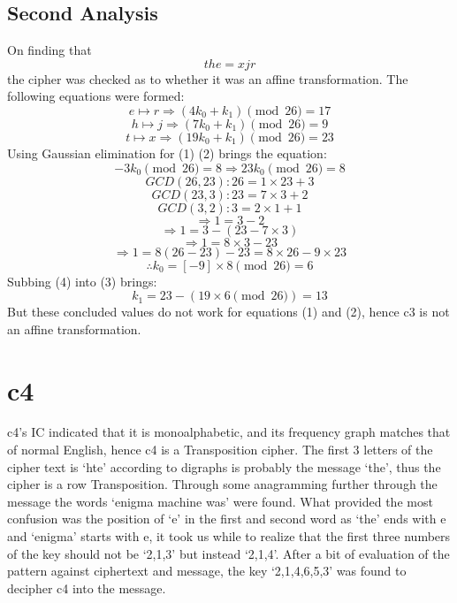 \documentclass{article}
\begin{document}
      \subsection{Second Analysis}
      On finding that \[ the = xjr \] the cipher was checked as to whether it was an affine transformation. The 
      following equations were formed:
      \begin{equation}
        e \mapsto r \Rightarrow (4 k_0 + k_1) \pmod{26} = 17
      \end{equation}
      \begin{equation}
        h \mapsto j \Rightarrow (7 k_0 + k_1) \pmod{26} = 9
      \end{equation}
      \begin{equation}
        t \mapsto x \Rightarrow (19 k_0 + k_1) \pmod{26} = 23
       \end{equation}
       Using Gaussian elimination for (1) \- (2) brings the equation:
       \begin{equation}
         -3 k_0 \pmod{26} = 8 \Rightarrow 23 k_0 \pmod{26} = 8
       \end{equation}
       \[ GCD(26,23): 26 = 1 \times 23 + 3 \]
       \[ GCD(23,3):  23 = 7 \times 3 + 2 \] 
       \[ GCD(3,2): 3 = 2 \times 1 + 1 \] 
       \[ \Rightarrow 1 = 3 - 2 \] 
       \[ \Rightarrow 1 = 3 - (23 - 7 \times 3) \] 
       \[ \Rightarrow 1 = 8 \times 3 - 23 \] 
       \[ \Rightarrow 1 = 8(26 - 23) - 23 = 8 \times 26 - 9 \times 23 \]
       \begin{equation}
         \therefore k_0 = [-9] \times 8 \pmod{26} = 6
       \end{equation}
       Subbing (4) into (3) brings:
       \begin{equation}
         k_1 = 23 - (19 \times 6 \pmod{26}) = 13
       \end{equation}
       But these concluded values do not work for equations (1) and (2), hence c3 is not an affine transformation.
      \section{c4}
      c4's IC indicated that it is monoalphabetic, and its frequency graph matches that
      of normal English, hence c4 is a Transposition cipher. The first 3 letters of the
      cipher text is `hte' according to digraphs is probably the message `the', thus the
      cipher is a row Transposition. Through some anagramming further through the message 
      the words `enigma machine was' were found. What provided the most confusion was the 
      position of `e' in the first and second word as `the' ends with e and `enigma' starts
      with e, it took us while to realize that the first three numbers of the key should not
      be `2,1,3' but instead `2,1,4'. After a bit of evaluation of the pattern 
      against ciphertext and message, the key `2,1,4,6,5,3' was found to decipher %
      c4 into the message. \\
\end{document}
